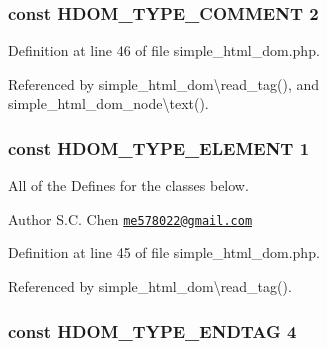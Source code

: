 \subsubsection[{H\+D\+O\+M\+\_\+\+T\+Y\+P\+E\+\_\+\+C\+O\+M\+M\+E\+N\+T}]{\setlength{\rightskip}{0pt plus 5cm}const H\+D\+O\+M\+\_\+\+T\+Y\+P\+E\+\_\+\+C\+O\+M\+M\+E\+N\+T 2}\label{simple__html__dom_8php_ae045af0527e4d0ebd351cbd0b0ff8124}


Definition at line 46 of file simple\+\_\+html\+\_\+dom.\+php.



Referenced by simple\+\_\+html\+\_\+dom\textbackslash{}read\+\_\+tag(), and simple\+\_\+html\+\_\+dom\+\_\+node\textbackslash{}text().

\hypertarget{simple__html__dom_8php_a3436a40c141ec78cc95c71f59f993087}{}
\subsubsection[{H\+D\+O\+M\+\_\+\+T\+Y\+P\+E\+\_\+\+E\+L\+E\+M\+E\+N\+T}]{\setlength{\rightskip}{0pt plus 5cm}const H\+D\+O\+M\+\_\+\+T\+Y\+P\+E\+\_\+\+E\+L\+E\+M\+E\+N\+T 1}\label{simple__html__dom_8php_a3436a40c141ec78cc95c71f59f993087}
All of the Defines for the classes below. \begin{DoxyAuthor}{Author}
S.\+C. Chen \href{mailto:me578022@gmail.com}{\tt me578022@gmail.\+com} 
\end{DoxyAuthor}


Definition at line 45 of file simple\+\_\+html\+\_\+dom.\+php.



Referenced by simple\+\_\+html\+\_\+dom\textbackslash{}read\+\_\+tag().

\hypertarget{simple__html__dom_8php_a9ede8929bc6af082032dc7fc3becc2f5}{}
\subsubsection[{H\+D\+O\+M\+\_\+\+T\+Y\+P\+E\+\_\+\+E\+N\+D\+T\+A\+G}]{\setlength{\rightskip}{0pt plus 5cm}const H\+D\+O\+M\+\_\+\+T\+Y\+P\+E\+\_\+\+E\+N\+D\+T\+A\+G 4}\label{simple__html__dom_8php_a9ede8929bc6af082032dc7fc3becc2f5}


